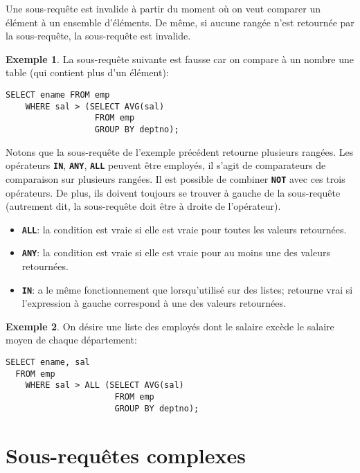 \documentclass[a4paper, 12pt]{report}
\newcommand{\textSQL}[1]{\texttt{\textbf{#1}}}
\theoremstyle{definition} \newtheorem{ex}{Exemple}
\begin{document}
Une sous-requête est invalide à partir du moment où on veut comparer un élément à un ensemble d'éléments. De même, si aucune rangée n'est retournée par la sous-requête, la sous-requête est invalide.
\begin{ex}
	La sous-requête suivante est fausse car on compare à un nombre une table (qui contient plus d'un élément):
	\begin{lstlisting}[frame=single]
SELECT ename FROM emp
	WHERE sal > (SELECT AVG(sal)
		          FROM emp
		          GROUP BY deptno);
	\end{lstlisting}
\end{ex}
Notons que la sous-requête de l'exemple précédent retourne plusieurs rangées. Les opérateurs \textSQL{IN}, \textSQL{ANY}, \textSQL{ALL} peuvent être employés, il s'agit de comparateurs de comparaison sur plusieurs rangées. Il est possible de combiner \textSQL{NOT} avec ces trois opérateurs. De plus, ils doivent toujours se trouver à gauche de la sous-requête (autrement dit, la sous-requête doit être à droite de l'opérateur).
\begin{itemize}
	\item \textSQL{ALL}: la condition est vraie si elle est vraie pour toutes les valeurs retournées.
	\item \textSQL{ANY}: la condition est vraie si elle est vraie pour au moins une des valeurs retournées.
	\item \textSQL{IN}: a le même fonctionnement que lorsqu'utilisé sur des listes; retourne vrai si l'expression à gauche correspond à une des valeurs retournées.
\end{itemize}
\begin{ex}
  On désire une liste des employés dont le salaire excède le salaire moyen de chaque département:
	\begin{lstlisting}[frame=single]
SELECT ename, sal
  FROM emp
	WHERE sal > ALL (SELECT AVG(sal)
		              FROM emp
		              GROUP BY deptno);
	\end{lstlisting}
\end{ex}

\section{Sous-requêtes complexes}
\end{document}

